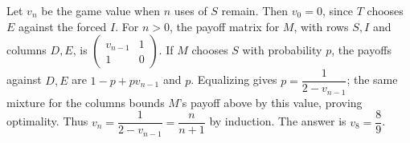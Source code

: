 Let $v_n$ be the game value when $n$ uses of $S$ remain. Then $v_0=0$, since $T$ chooses $E$ against the forced $I$. For $n>0$, the payoff matrix for $M$, with rows $S,I$ and columns $D,E$, is $\begin{pmatrix}v_{n-1}&1\\1&0\end{pmatrix}$. If $M$ chooses $S$ with probability $p$, the payoffs against $D,E$ are $1-p+p v_{n-1}$ and $p$. Equalizing gives $p=\dfrac{1}{2-v_{n-1}}$; the same mixture for the columns bounds $M$'s payoff above by this value, proving optimality. Thus $v_n=\dfrac{1}{2-v_{n-1}}=\dfrac{n}{n+1}$ by induction. The answer is $\boxed{v_8=\dfrac{8}{9}}$.
